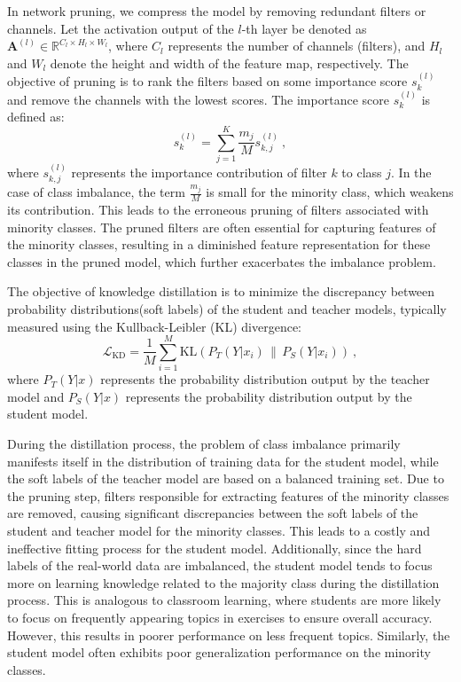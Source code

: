 \documentclass[twoside,11pt]{article}
\begin{document}
In network pruning, we compress the model by removing redundant filters or channels. Let the activation output of the $ l $-th layer be denoted as $ \mathbf{A}^{(l)} \in \mathbb{R}^{C_l \times H_l \times W_l} $, where $ C_l $ represents the number of channels (filters), and $ H_l $ and $ W_l $ denote the height and width of the feature map, respectively. The objective of pruning is to rank the filters based on some importance score $ s_k^{(l)} $ and remove the channels with the lowest scores. The importance score $ s_k^{(l)} $ is defined as:
\begin{equation}
\label{eq: pruning}
s_k^{(l)} = \sum_{j=1}^K \frac{m_j}{M} s_{k,j}^{(l)}\ , 
\end{equation}
where $ s_{k,j}^{(l)} $ represents the importance contribution of filter $ k $ to class $ j $. In the case of class imbalance, the term $ \frac{m_j}{M} $ is small for the minority class, which weakens its contribution. This leads to the erroneous pruning of filters associated with minority classes. The pruned filters are often essential for capturing features of the minority classes, resulting in a diminished feature representation for these classes in the pruned model, which further exacerbates the imbalance problem.


The objective of knowledge distillation is to minimize the discrepancy between probability distributions(soft labels) of the student and teacher models, typically measured using the Kullback-Leibler (KL) divergence:
\begin{equation}
\mathcal{L}_{\text{KD}} = \frac{1}{M} \sum_{i=1}^M \text{KL}\left(P_T(Y|x_i) \, \| \, P_S(Y|x_i)\right)\ ,  
\end{equation}
where $P_T(Y|x)$ represents the probability distribution output by the teacher model and $P_S(Y|x)$ represents the probability distribution output by the student model.

During the distillation process, the problem of class imbalance primarily manifests itself in the distribution of training data for the student model, while the soft labels of the teacher model are based on a balanced training set. Due to the pruning step, filters responsible for extracting features of the minority classes are removed, causing significant discrepancies between the soft labels of the student and teacher model for the minority classes. This leads to a costly and ineffective fitting process for the student model. Additionally, since the hard labels of the real-world data are imbalanced, the student model tends to focus more on learning knowledge related to the majority class during the distillation process. This is analogous to classroom learning, where students are more likely to focus on frequently appearing topics in exercises to ensure overall accuracy. However, this results in poorer performance on less frequent topics. Similarly, the student model often exhibits poor generalization performance on the minority classes.
\end{document}
